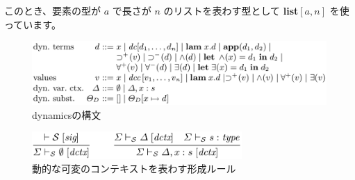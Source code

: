 \documentclass[submit,techreq,noauthor,onecolumn]{ipsj}
\begin{document}
このとき、要素の型が $a$ で長さが $n$ のリストを表わす型として {\bf list}$[a,n]$ を使っています。

\begin{figure}[h]
\centering
\includegraphics[width=14cm]{img/fig3_syntax_dynamics.png}
\caption{dynamicsの構文}
\label{fig:fig3_syntax_dynamics}
\end{figure}

\begin{figure}[h]
\centering
\includegraphics[width=8cm]{img/fig4_rules_dynamics.png}
\caption{動的な可変のコンテキストを表わす形成ルール}
\label{fig:fig4_rules_dynamics}
\end{figure}


\begin{acknowledgment}
\end{acknowledgment}

\begin{thebibliography}{10}
\end{thebibliography}
\end{document}
